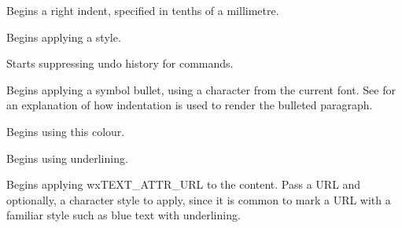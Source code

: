 
Begins a right indent, specified in tenths of a millimetre.

\label{wxrichtextctrlbeginstyle}


Begins applying a style.

\label{wxrichtextctrlbeginsuppressundo}


Starts suppressing undo history for commands.

\label{wxrichtextctrlbeginsymbolbullet}


Begins applying a symbol bullet, using a character from the current font. See  for
an explanation of how indentation is used to render the bulleted paragraph.

\label{wxrichtextctrlbegintextcolour}


Begins using this colour.

\label{wxrichtextctrlbeginunderline}


Begins using underlining.

\label{wxrichtextctrlbeginurl}


Begins applying wxTEXT\_ATTR\_URL to the content. Pass a URL and optionally, a character style to apply,
since it is common to mark a URL with a familiar style such as blue text with underlining.

\label{wxrichtextctrlcancopy}


